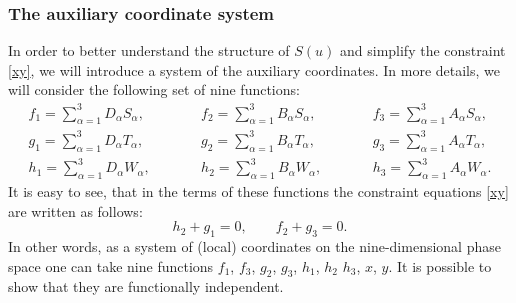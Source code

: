 \documentclass[pdftex]{sigma}
\def\a{\alpha}
\numberwithin{equation}{section}
\begin{document}
\subsubsection{The auxiliary coordinate system}
In order to better understand the structure of $S(u)$ and simplify the constraint \eqref{xy}, we will introduce a system of the auxiliary coordinates. In more details, we will consider the following set of nine functions:
\begin{subequations}\label{fgh}
\begin{alignat}{4}
 &f_1 = \sum\limits_{\a=1}^3 D_{\a} S_{\a},\qquad&&
 f_2 = \sum\limits_{\a=1}^3 B_{\a} S_{\a}, \qquad&&
 f_3 = \sum\limits_{\a=1}^3 A_{\a} S_{\a},&
\\
& g_1 = \sum\limits_{\a=1}^3 D_{\a} T_{\a},\qquad&&
 g_2 = \sum\limits_{\a=1}^3 B_{\a} T_{\a}, \qquad&&
 g_3 = \sum\limits_{\a=1}^3 A_{\a} T_{\a},&
\\
& h_1 = \sum\limits_{\a=1}^3 D_{\a} W_{\a},\qquad&&
 h_2 = \sum\limits_{\a=1}^3 B_{\a} W_{\a}, \qquad&&
 h_3 = \sum\limits_{\a=1}^3 A_{\a} W_{\a}.&
 \end{alignat}
\end{subequations}
It is easy to see, that in the terms of these functions the constraint equations \eqref{xy} are written as follows:
\begin{equation}\label{mconstr}
h_2+g_1=0,\qquad f_2 +g_3=0.
\end{equation}
In other words, as a system of (local) coordinates on the nine-dimensional phase space one can take nine functions $f_1$, $f_3$, $g_2$, $g_3$, $h_1$, $h_2$ $h_3$, $x$, $y$. It is possible to show that they are functionally independent.
\end{document}
